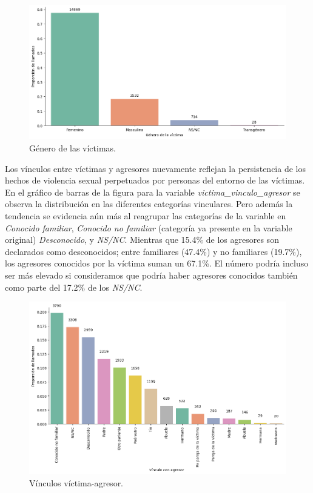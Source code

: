 \documentclass[10 pt]{article}
\begin{document}
\begin{figure}[H]
    \begin{center}
    \includegraphics[scale=.5]{images/latex_genero_victima.png}
    \caption{Género de las víctimas.}
    \label{genero}
    \end{center}
    \end{figure}

Los vínculos entre víctimas y agresores nuevamente reflejan la persistencia de los hechos de violencia sexual perpetuados por personas del entorno de las víctimas. En el gráfico de barras de la figura  para la variable \textit{victima\_vinculo\_agresor} se observa la distribución en las diferentes categorías vinculares. Pero además la tendencia se evidencia aún más al reagrupar las categorías de la variable en \textit{Conocido familiar}, \textit{Conocido no familiar} (categoría ya presente en la variable original) \textit{Desconocido}, y \textit{NS/NC}. Mientras que 15.4\% de los agresores son declarados como desconocidos; entre familiares (47.4\%) y no familiares (19.7\%), los agresores conocidos por la víctima suman un 67.1\%. El número podría incluso ser más elevado si consideramos que podría haber agresores conocidos también como parte del 17.2\% de los \textit{NS/NC}.



\begin{figure}[H]
    \begin{center}
    \includegraphics[scale=.5]{images/latex_vinculo_agr_victima.png}
    \caption{Vínculos víctima-agresor.}
    \label{vinculoagresor}
    \end{center}
    \end{figure}
\end{document}
